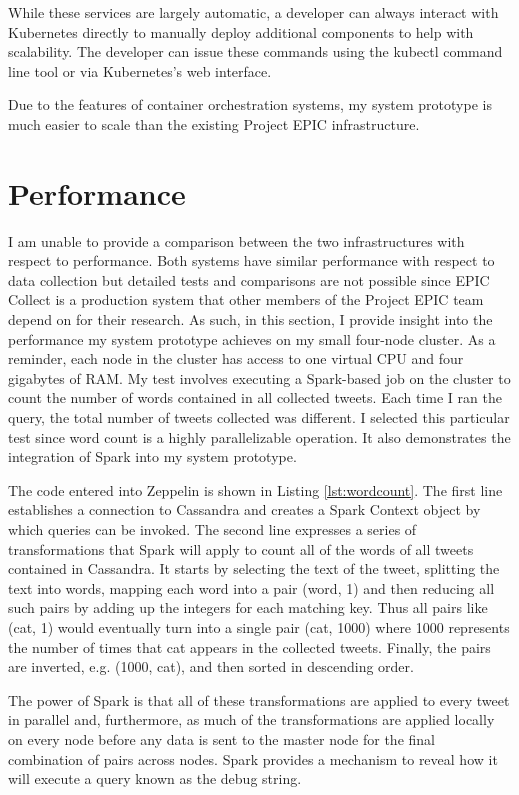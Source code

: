 While these services are largely automatic, a developer can always interact with Kubernetes directly to manually deploy additional components to help with scalability. The developer can issue these commands using the kubectl command line tool or via Kubernetes’s web interface.

Due to the features of container orchestration systems, my system prototype is much easier to scale than the existing Project EPIC infrastructure. 


\section{Performance}

I am unable to provide a comparison between the two infrastructures with respect to performance. Both systems have similar performance with respect to data collection but detailed tests and comparisons are not possible since EPIC Collect is a production system that other members of the Project EPIC team depend on for their research. As such, in this section, I provide insight into the performance my system prototype achieves on my small four-node cluster. As a reminder, each node in the cluster has access to one virtual CPU and four gigabytes of RAM. My test involves executing a Spark-based job on the cluster to count the number of words contained in all collected tweets. Each time I ran the query, the total number of tweets collected was different. I selected this particular test since word count is a highly parallelizable operation. It also demonstrates the integration of Spark into my system prototype.


The code entered into Zeppelin is shown in Listing \ref{lst:wordcount}.  The first line establishes a connection to Cassandra and creates a Spark Context object by which queries can be invoked. The second line expresses a series of transformations that Spark will apply to count all of the words of all tweets contained in Cassandra. It starts by selecting the text of the tweet, splitting the text into words, mapping each word into a pair (word, 1) and then reducing all such pairs by adding up the integers for each matching key. Thus all pairs like (cat, 1) would eventually turn into a single pair (cat, 1000) where 1000 represents the number of times that cat appears in the collected tweets. Finally, the pairs are inverted, e.g. (1000, cat), and then sorted in descending order.

The power of Spark is that all of these transformations are applied to every tweet in parallel and, furthermore, as much of the transformations are applied locally on every node before any data is sent to the master node for the final combination of pairs across nodes. Spark provides a mechanism to reveal how it will execute a query known as the debug string.



